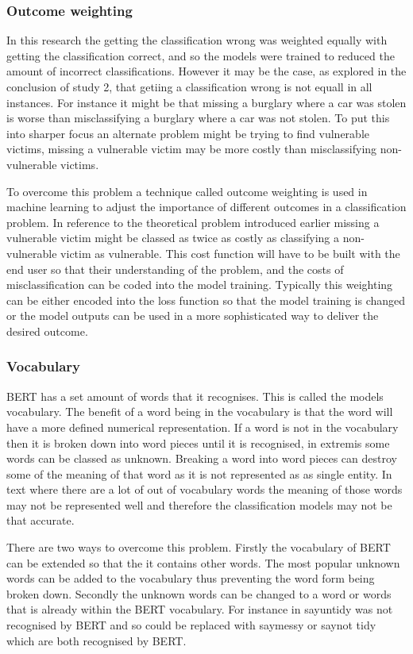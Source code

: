 \subsubsection{Outcome weighting} In this research the getting the classification wrong was weighted equally with getting the classification correct, and so the models were trained to reduced the amount of incorrect classifications. However it may be the case, as explored in the conclusion of study 2, that getiing a classification wrong is not equall in all instances. For instance it might be that missing a burglary where a car was stolen is worse than misclassifying a burglary where a car was not stolen. To put this into sharper focus an alternate problem might be trying to find vulnerable victims, missing a vulnerable victim may be more costly than misclassifying non-vulnerable victims. 

To overcome this problem a technique called outcome weighting is used in machine learning to adjust the importance of different outcomes in a classification problem. In reference to the theoretical problem introduced earlier missing a vulnerable victim might be classed as twice as costly as classifying a non-vulnerable victim as vulnerable. This cost function will have to be built with the end user so that their understanding of the problem, and the costs of misclassification can be coded into the model training. Typically this weighting can be either encoded into the loss function so that the model training is changed or the model outputs can be used in a more sophisticated way to deliver the desired outcome.  


\subsubsection{Vocabulary} BERT has a set amount of words that it recognises. This is called the models vocabulary. The benefit of a word being in the vocabulary is that the word will have a more defined numerical representation. If a word is not in the vocabulary then it is broken down into word pieces until it is recognised, in extremis some words can be classed as unknown. Breaking a word into word pieces can destroy some of the meaning of that word as it is not represented as as single entity. In text where there are a lot of out of vocabulary words the meaning of those words may  not be represented well and therefore the classification models may not be that accurate. 

There are two ways to overcome this problem. Firstly the vocabulary of BERT can be extended so that the it contains other words. The most popular unknown words can be added to the vocabulary thus preventing the word form being broken down. Secondly the unknown words can be changed to  a word or words that is already within the BERT vocabulary.  For instance in say{untidy} was not recognised by BERT and so could be replaced with say{messy} or say{not tidy} which are both recognised by BERT. 

